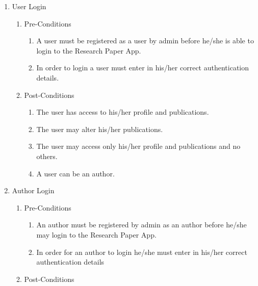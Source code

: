 \documentclass[hidelinks,a4paper,12pt]{article}
\begin{document}
	\begin{enumerate}
		\item  User Login
		
		\begin{enumerate}
			\item  Pre-Conditions
			
			\begin{enumerate}
				\item  A user must be registered as a user by admin before he/she is able to login to the Research Paper App.
				
				\item  In order to login a user must enter in his/her correct authentication details.
			\end{enumerate}
			
			\item  Post-Conditions
			
			\begin{enumerate}
				\item  The user has access to his/her profile and publications.
				
				\item  The user may alter his/her publications.
				
				\item  The user may access only his/her profile and publications and no others.
				
				\item  A user can be an author.
			\end{enumerate}
		\end{enumerate}
		
		\noindent 
		
		\item  Author Login
		
		\begin{enumerate}
			\item  Pre-Conditions
			
			\begin{enumerate}
				\item  An author must be registered by admin as an author before he/she may login to the Research Paper App.
				
				\item  In order for an author to login he/she must enter in his/her correct authentication details
			\end{enumerate}
			
			\item  Post-Conditions
			

\end{enumerate}
\end{enumerate}
\end{document}
